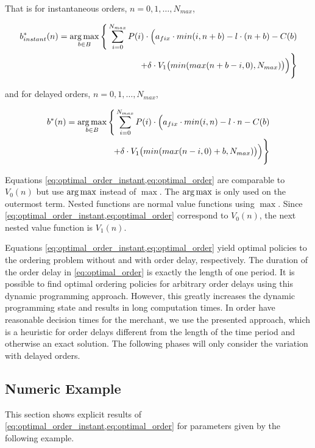 That is for instantaneous orders, $n=0,1,\ldots,N_{max}$,

\begin{equation}
\begin{split}
b^*_{instant}(n) = \argmax_{b \in B} \Bigg\{
\sum_{i = 0}^{N_{max}}
P(i) \cdot \Big(
a_{fix} \cdot min(i, n + b) %
- l \cdot (n + b) %
- C(b) %
\\
+ \delta \cdot V_{1}\big(min(max(n + b - i, 0), N_{max})\big)
\Big)\Bigg\}
\end{split}
\label{eq:optimal_order_instant}
\end{equation}

and for delayed orders, $n=0,1,\ldots,N_{max}$,

\begin{equation}
\begin{split}
b^*(n) = \argmax_{b \in B} \Bigg\{
\sum_{i = 0}^{N_{max}} 
P(i) \cdot \Big(
a_{fix} \cdot min(i, n) %
- l \cdot n %
- C(b) %
 \\
+ \delta \cdot V_{1}\big(min(max(n - i, 0) + b, N_{max})\big)
\Big)\Bigg\}
\end{split}
\label{eq:optimal_order}
\end{equation}

Equations \cref{eq:optimal_order_instant,eq:optimal_order} are comparable to $V_0(n)$ but use $\operatorname*{arg\,max}$ instead of $\max$. The $\operatorname*{arg\,max}$ is only used on the outermost term.
Nested functions are normal value functions using $\max$.
Since \cref{eq:optimal_order_instant,eq:optimal_order} correspond to $V_0(n)$, the next nested value function is $V_1(n)$.

Equations \cref{eq:optimal_order_instant,eq:optimal_order} yield optimal policies to the ordering problem without and with order delay, respectively.
The duration of the order delay in \cref{eq:optimal_order} is exactly the length of one period.
It is possible to find optimal ordering policies for arbitrary order delays using this dynamic programming approach.
However, this greatly increases the dynamic programming state and results in long computation times.
In order have reasonable decision times for the merchant, we use the presented approach, which is a heuristic for order delays different from the length of the time period and otherwise an exact solution.
The following phases will only consider the variation with delayed orders.

\subsection{Numeric Example}
\label{section:order_example}
This section shows explicit results of \cref{eq:optimal_order_instant,eq:optimal_order} for parameters given by the following example.


